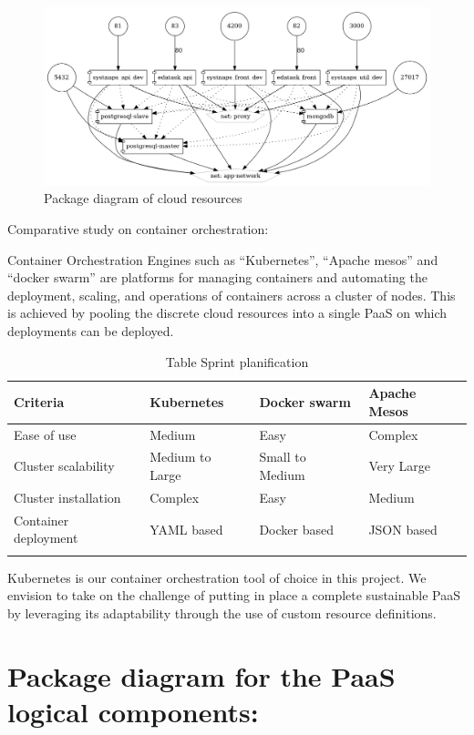\begin{figure}[H]\centering
\includegraphics[width=1.0\textwidth,angle=00]{assets/f10.png}
\caption{Package diagram of cloud resources }
\label{fig:f10}
\end{figure}

\newpage
Comparative study on container orchestration: 

Container Orchestration Engines such as “Kubernetes”, “Apache mesos” and “docker swarm” are platforms for managing containers and automating the deployment, scaling, and operations of containers across a cluster of nodes. This is achieved by pooling the discrete cloud resources into a single PaaS on which deployments can be deployed. 

\begin{longtable}[H]{|m{3.5cm}|m{3.5cm}|m{3.5cm}|m{3.5cm}|}
\hline
Criteria & Kubernetes & Docker swarm & Apache Mesos  \\
\hline
Ease of use & Medium & Easy & Complex  \\
\hline
Cluster scalability & Medium to Large & Small to Medium & Very Large  \\
\hline
Cluster installation & Complex & Easy & Medium  \\
\hline
Container deployment & YAML based  & Docker based & JSON based \\
\hline
\caption{Table Sprint planification}
\end{longtable}

Kubernetes is our container orchestration tool of choice in this project. We envision to take on the challenge of putting in place a complete sustainable PaaS by leveraging its adaptability through the use of custom resource definitions. 


\section{Package diagram for the PaaS logical components:}

